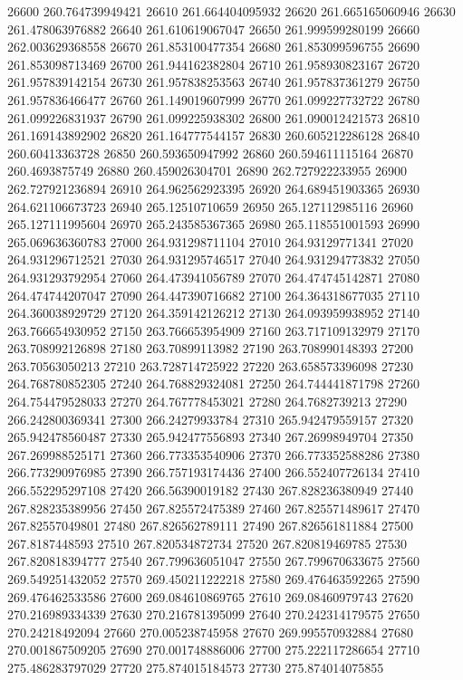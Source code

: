 {26600 260.764739949421
26610 261.664404095932
26620 261.665165060946
26630 261.478063976882
26640 261.610619067047
26650 261.999599280199
26660 262.003629368558
26670 261.853100477354
26680 261.853099596755
26690 261.853098713469
26700 261.944162382804
26710 261.958930823167
26720 261.957839142154
26730 261.957838253563
26740 261.957837361279
26750 261.957836466477
26760 261.149019607999
26770 261.099227732722
26780 261.099226831937
26790 261.099225938302
26800 261.090012421573
26810 261.169143892902
26820 261.164777544157
26830 260.605212286128
26840 260.60413363728
26850 260.593650947992
26860 260.594611115164
26870 260.4693875749
26880 260.459026304701
26890 262.727922233955
26900 262.727921236894
26910 264.962562923395
26920 264.689451903365
26930 264.621106673723
26940 265.12510710659
26950 265.127112985116
26960 265.127111995604
26970 265.243585367365
26980 265.118551001593
26990 265.069636360783
27000 264.931298711104
27010 264.93129771341
27020 264.931296712521
27030 264.931295746517
27040 264.931294773832
27050 264.931293792954
27060 264.473941056789
27070 264.474745142871
27080 264.474744207047
27090 264.447390716682
27100 264.364318677035
27110 264.360038929729
27120 264.359142126212
27130 264.093959938952
27140 263.766654930952
27150 263.766653954909
27160 263.717109132979
27170 263.708992126898
27180 263.70899113982
27190 263.708990148393
27200 263.70563050213
27210 263.728714725922
27220 263.658573396098
27230 264.768780852305
27240 264.768829324081
27250 264.744441871798
27260 264.754479528033
27270 264.767778453021
27280 264.7682739213
27290 266.242800369341
27300 266.24279933784
27310 265.942479559157
27320 265.942478560487
27330 265.942477556893
27340 267.26998949704
27350 267.269988525171
27360 266.773353540906
27370 266.773352588286
27380 266.773290976985
27390 266.757193174436
27400 266.552407726134
27410 266.552295297108
27420 266.56390019182
27430 267.828236380949
27440 267.828235389956
27450 267.825572475389
27460 267.825571489617
27470 267.82557049801
27480 267.826562789111
27490 267.826561811884
27500 267.8187448593
27510 267.820534872734
27520 267.820819469785
27530 267.820818394777
27540 267.799636051047
27550 267.799670633675
27560 269.549251432052
27570 269.450211222218
27580 269.476463592265
27590 269.476462533586
27600 269.084610869765
27610 269.08460979743
27620 270.216989334339
27630 270.216781395099
27640 270.242314179575
27650 270.24218492094
27660 270.005238745958
27670 269.995570932884
27680 270.001867509205
27690 270.001748886006
27700 275.222117286654
27710 275.486283797029
27720 275.874015184573
27730 275.874014075855
}
